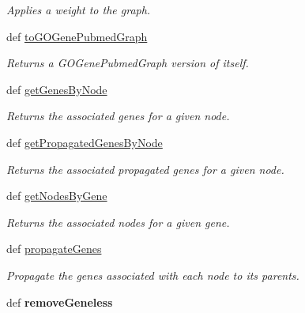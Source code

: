 \begin{DoxyCompactItemize}
\begin{DoxyCompactList}\small\item\em Applies a weight to the graph. \end{DoxyCompactList}\item 
def \hyperlink{classgographer_1_1_g_o_gene_graph_1_1_g_o_gene_graph_aea30558201b976275fa3320e66da9ba3}{to\-G\-O\-Gene\-Pubmed\-Graph}
\begin{DoxyCompactList}\small\item\em Returns a G\-O\-Gene\-Pubmed\-Graph version of itself. \end{DoxyCompactList}\item 
def \hyperlink{classgographer_1_1_g_o_gene_graph_1_1_g_o_gene_graph_a36ebebaac8f9a6fc69dec930bcd57afa}{get\-Genes\-By\-Node}
\begin{DoxyCompactList}\small\item\em Returns the associated genes for a given node. \end{DoxyCompactList}\item 
def \hyperlink{classgographer_1_1_g_o_gene_graph_1_1_g_o_gene_graph_a12623d6d01943b58fd065e622d687f4e}{get\-Propagated\-Genes\-By\-Node}
\begin{DoxyCompactList}\small\item\em Returns the associated propagated genes for a given node. \end{DoxyCompactList}\item 
def \hyperlink{classgographer_1_1_g_o_gene_graph_1_1_g_o_gene_graph_ad5a7be95214be3c6578e295151fe080b}{get\-Nodes\-By\-Gene}
\begin{DoxyCompactList}\small\item\em Returns the associated nodes for a given gene. \end{DoxyCompactList}\item 
\hypertarget{classgographer_1_1_g_o_gene_graph_1_1_g_o_gene_graph_ab0c9a34834a02ea747d4b8826e9ac7fb}{def \hyperlink{classgographer_1_1_g_o_gene_graph_1_1_g_o_gene_graph_ab0c9a34834a02ea747d4b8826e9ac7fb}{propagate\-Genes}}\label{classgographer_1_1_g_o_gene_graph_1_1_g_o_gene_graph_ab0c9a34834a02ea747d4b8826e9ac7fb}

\begin{DoxyCompactList}\small\item\em Propagate the genes associated with each node to its parents. \end{DoxyCompactList}\item 
\hypertarget{classgographer_1_1_g_o_gene_graph_1_1_g_o_gene_graph_a95b66354ebca8636f3837aa8d2e61295}{def {\bfseries remove\-Geneless}}\label{classgographer_1_1_g_o_gene_graph_1_1_g_o_gene_graph_a95b66354ebca8636f3837aa8d2e61295}

\end{DoxyCompactItemize}
